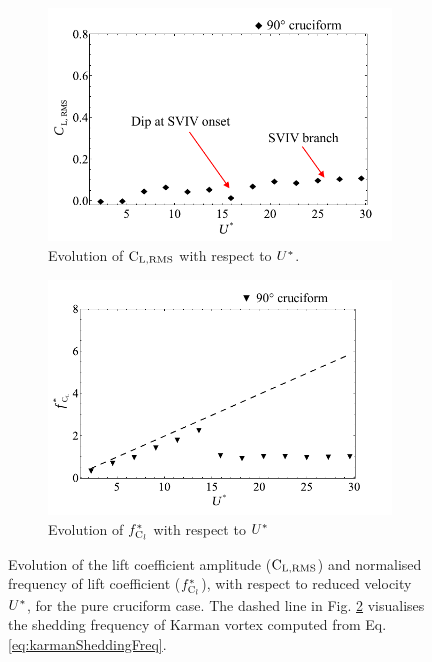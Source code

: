 \documentclass[oneside]{utmthesis}
\begin{document}
\begin{figure}[!h]
  \centering
  \begin{subfigure}[h]{0.8\textwidth}
    \includegraphics[width=\textwidth]{figs/clRMS5}
    \caption{Evolution of $\text{C}_{\text{L,RMS}}$ with respect to $U^{*}$.}
    \label{fig:clRMS5}
  \end{subfigure}

  \begin{subfigure}[h]{0.8\textwidth}
    \includegraphics[width=\textwidth]{figs/clFreq5}
    \caption{Evolution of $f_{\text{C}_{l}}^{*}$ with respect to $U^{*}$}
    \label{fig:clFreq5}
  \end{subfigure}

  \caption{Evolution of the lift coefficient \rms{} amplitude ($\text{C}_{\text{L,RMS}}$) and normalised frequency of lift coefficient ($f_{\text{C}_{l}}^{*}$), with respect to reduced velocity $U^{*}$, for the pure cruciform case. The dashed line in Fig. \ref{fig:clFreq5} visualises the shedding frequency of Karman vortex computed from Eq. \ref{eq:karmanSheddingFreq}.} \label{fig:cl90}
\end{figure}
\end{document}
